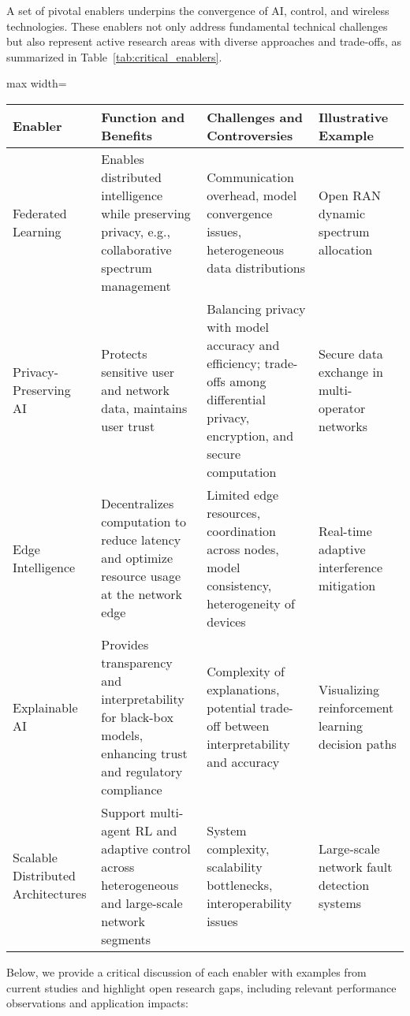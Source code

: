 \documentclass[sigconf]{acmart}
\begin{document}
A set of pivotal enablers underpins the convergence of AI, control, and wireless technologies. These enablers not only address fundamental technical challenges but also represent active research areas with diverse approaches and trade-offs, as summarized in Table~\ref{tab:critical_enablers}.

\begin{table*}[htbp]
\centering
\caption{Summary and Analysis of Critical Enablers in AI-Driven Wireless Networks}
\label{tab:critical_enablers}
\begin{adjustbox}{max width=\textwidth}
\begin{tabular}{@{}llll@{}}
\toprule
\textbf{Enabler} & \textbf{Function and Benefits} & \textbf{Challenges and Controversies} & \textbf{Illustrative Example} \\ \midrule
Federated Learning & Enables distributed intelligence while preserving privacy, e.g., collaborative spectrum management & Communication overhead, model convergence issues, heterogeneous data distributions & Open RAN dynamic spectrum allocation \cite{ref49} \\
Privacy-Preserving AI & Protects sensitive user and network data, maintains user trust & Balancing privacy with model accuracy and efficiency; trade-offs among differential privacy, encryption, and secure computation & Secure data exchange in multi-operator networks \\
Edge Intelligence & Decentralizes computation to reduce latency and optimize resource usage at the network edge & Limited edge resources, coordination across nodes, model consistency, heterogeneity of devices & Real-time adaptive interference mitigation \\
Explainable AI & Provides transparency and interpretability for black-box models, enhancing trust and regulatory compliance & Complexity of explanations, potential trade-off between interpretability and accuracy \cite{ref50} & Visualizing reinforcement learning decision paths \\
Scalable Distributed Architectures & Support multi-agent RL and adaptive control across heterogeneous and large-scale network segments & System complexity, scalability bottlenecks, interoperability issues & Large-scale network fault detection systems \\ \bottomrule
\end{tabular}
\end{adjustbox}
\end{table*}

Below, we provide a critical discussion of each enabler with examples from current studies and highlight open research gaps, including relevant performance observations and application impacts:
\end{document}
